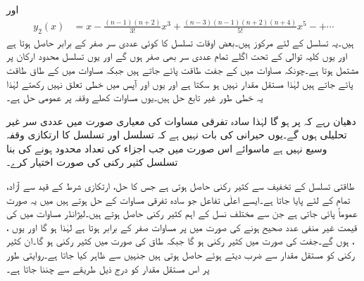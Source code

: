 اور
\begin{align}\label{مساوات_بیسل_حل_لیژانڈر_ب}
y_2(x)&=x-\frac{(n-1)(n+2)}{3!}x^3+\frac{(n-3)(n-1)(n+2)(n+4)}{5!}x^5-+\cdots
\end{align}
ہیں۔یہ تسلسل  کے لئے مرکوز ہیں۔بعض اوقات تسلسل کا کوئی عددی سر صفر کے برابر حاصل ہوتا ہے اور یوں کلیہ توالی کے تحت اگلے تمام عددی سر بھی صفر ہوں گے اور یوں تسلسل محدود ارکان پر مشتمل ہوتا ہے۔چونکہ مساوات  میں  کے جفت طاقت پائے جاتے ہیں جبکہ مساوات  میں  کے طاق طاقت پائے جاتے ہیں لہٰذا  مستقل مقدار نہیں ہو سکتا ہے اور یوں  اور  آپس میں خطی تعلق نہیں رکھتے لہٰذا یہ خطی طور غیر تابع حل ہیں۔یوں مساوات  کھلے وقفہ  پر عمومی حل ہے۔

دھیان رہے کہ  پر  ہو گا لہٰذا سادہ تفرقی مساوات کی معیاری صورت میں عددی سر غیر تحلیلی ہوں گے۔یوں حیرانی کی بات نہیں ہے کہ تسلسل  اور تسلسل  کا ارتکازی وقفہ وسیع نہیں ہے ماسوائے اس صورت میں جب  اجزاء کی تعداد محدود ہونے کی بنا  تسلسل کثیر رکنی کی صورت اختیار کرے۔

طاقتی تسلسل کے تخفیف سے کثیر رکنی حاصل ہوتی ہے جس کا حل، ارتکازی شرط کے قید سے آزاد،  تمام  کے لئے پایا جاتا ہے۔ایسے اعلٰی تفاعل جو سادہ تفرقی مساوات کے حل ہوتے ہیں میں یہ صورت عموماً پائی جاتی ہے جن سے مختلف نسل کے اہم کثیر رکنی حاصل ہوتے ہیں۔لیژانڈر مساوات میں  کی قیمت غیر منفی عدد صحیح ہونے کی صورت میں  پر مساوات  صفر کے برابر ہوتا ہے لہٰذا  ہو گا اور یوں ، ،  ہوں گے۔جفت  کی صورت میں  کثیر رکنی ہو گا جبکہ طاق  کی صورت میں  کثیر رکنی ہو گا۔ان کثیر رکنی کو مستقل مقدار سے ضرب دیتے ہوئے  حاصل ہوتی ہیں جنہیں  سے ظاہر کیا جاتا ہے۔روایتی طور پر اس مستقل مقدار کو درج ذیل طریقے سے چننا جاتا ہے۔

